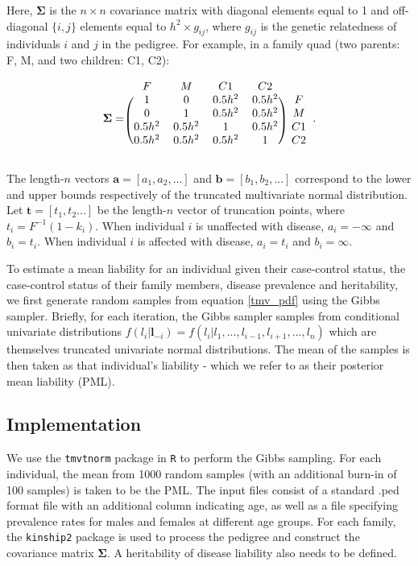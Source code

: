 \documentclass{article}
\begin{document}
\noindent Here, $\boldsymbol{\Sigma}$ is the $n \times n$ covariance matrix with diagonal elements equal to 1 and off-diagonal $\{i,j\}$ elements equal to $h^2 \times g_{ij}$, where $g_{ij}$ is the genetic relatedness of individuals $i$ and $j$ in the pedigree. For example, in a family quad (two parents: F, M, and two children: C1, C2):

\[
\boldsymbol{\Sigma}=\begin{blockarray}{ccccc}
F & M & C1 & C2 \\
\begin{block}{(cccc)c}
 1 & 0 & 0.5h^2 & 0.5h^2 & F \\
 0 & 1 & 0.5h^2 & 0.5h^2 & M \\
 0.5h^2 & 0.5h^2 & 1 & 0.5h^2 & C1 \\
 0.5h^2 & 0.5h^2 & 0.5h^2 & 1 & C2 \\
\end{block}
\end{blockarray}.
 \]

\noindent The length-$n$ vectors $\boldsymbol{a} = [a_1,a_2,...]$ and $\boldsymbol{b} = [b_1,b_2,...]$ correspond to the lower and upper bounds respectively of the truncated multivariate normal distribution. Let $\boldsymbol{t} = [t_1,t_2...]$ be the length-$n$ vector of truncation points, where $t_i = F^{-1}(1-k_i)$. When individual $i$ is unaffected with disease, $a_i = -\infty$ and $b_i = t_i$. When individual $i$ is affected with disease, $a_i = t_i$ and $b_i = \infty$.

To estimate a mean liability for an individual given their case-control status, the case-control status of their family members, disease prevalence and heritability, we first generate random samples from equation \ref{tmv_pdf} using the Gibbs sampler. Briefly, for each iteration, the Gibbs sampler samples from conditional univariate distributions $f(l_i | \boldsymbol{l}_{-i}) = f(l_i | l_1,...,l_{i-1},l_{i+1},...,l_n)$ which are themselves truncated univariate normal distributions. The mean of the samples is then taken as that individual's liability - which we refer to as their posterior mean liability (PML).

\subsection{Implementation}
We use the \texttt{tmvtnorm} package in \texttt{R} to perform the Gibbs sampling. For each individual, the mean from 1000 random samples (with an additional burn-in of 100 samples) is taken to be the PML. The input files consist of a standard .ped format file with an additional column indicating age, as well as a file specifying prevalence rates for males and females at different age groups. For each family, the \texttt{kinship2} package is used to process the pedigree and construct the covariance matrix $\boldsymbol{\Sigma}$. A heritability of disease liability also needs to be defined.
\end{document}
